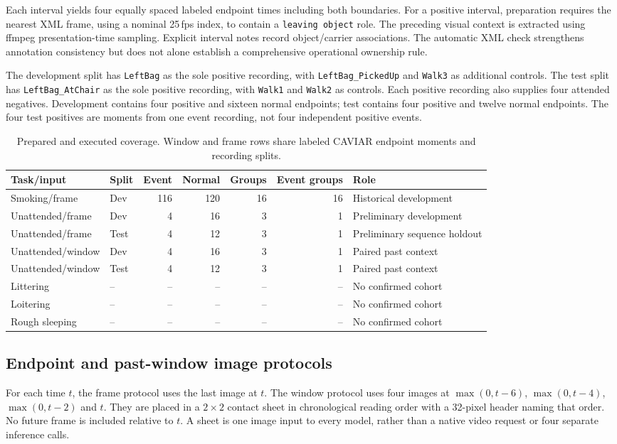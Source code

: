 \documentclass[11pt,a4paper]{article}
\newcommand{\code}[1]{\nolinkurl{#1}}
\begin{document}
Each interval yields four equally spaced labeled endpoint times including both boundaries. For a positive interval, preparation requires the nearest XML frame, using a nominal 25\,fps index, to contain a \code{leaving object} role. The preceding visual context is extracted using ffmpeg presentation-time sampling. Explicit interval notes record object/carrier associations. The automatic XML check strengthens annotation consistency but does not alone establish a comprehensive operational ownership rule.

The development split has \code{LeftBag} as the sole positive recording, with \code{LeftBag_PickedUp} and \code{Walk3} as additional controls. The test split has \code{LeftBag_AtChair} as the sole positive recording, with \code{Walk1} and \code{Walk2} as controls. Each positive recording also supplies four attended negatives. Development contains four positive and sixteen normal endpoints; test contains four positive and twelve normal endpoints. The four test positives are moments from one event recording, not four independent positive events.

\begin{table}[htbp]\centering\small
\caption{Prepared and executed coverage. Window and frame rows share labeled CAVIAR endpoint moments and recording splits.}
\setlength{\tabcolsep}{4pt}
\begin{tabular}{llrrrrl}\toprule
Task/input & Split & Event & Normal & Groups & Event groups & Role\\\midrule
Smoking/frame & Dev &116&120&16&16&Historical development\\
Unattended/frame & Dev &4&16&3&1&Preliminary development\\
Unattended/frame & Test &4&12&3&1&Preliminary sequence holdout\\
Unattended/window & Dev &4&16&3&1&Paired past context\\
Unattended/window & Test &4&12&3&1&Paired past context\\
Littering & -- &--&--&--&--&No confirmed cohort\\
Loitering & -- &--&--&--&--&No confirmed cohort\\
Rough sleeping & -- &--&--&--&--&No confirmed cohort\\
\bottomrule\end{tabular}\label{tab:coverage}\end{table}

\subsection{Endpoint and past-window image protocols}
For each time $t$, the frame protocol uses the last image at $t$. The window protocol uses four images at $\max(0,t-6)$, $\max(0,t-4)$, $\max(0,t-2)$ and $t$. They are placed in a $2\times2$ contact sheet in chronological reading order with a 32-pixel header naming that order. No future frame is included relative to $t$. A sheet is one image input to every model, rather than a native video request or four separate inference calls.
\end{document}
